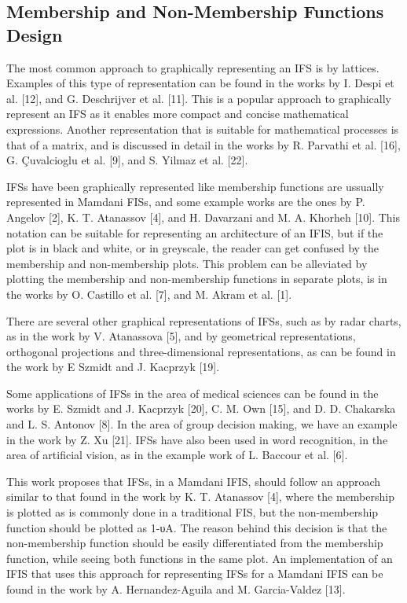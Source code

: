 \subsection{Membership and Non-Membership Functions Design}
\label{subsection:membership-and-non-membership-functions-design}

The most common approach to graphically representing an IFS is by
lattices. Examples of this type of representation can be found in the works by
I. Despi et al. [12], and G. Deschrijver et al. [11]. This is a popular approach
to graphically represent an IFS as it enables more compact and concise
mathematical expressions. Another representation that is suitable for
mathematical processes is that of a matrix, and is discussed in detail in the
works by R. Parvathi et al. [16],  G. Çuvalcioglu et al. [9], and S. Yilmaz et
al. [22].

IFSs have been graphically represented like membership functions are ussually
represented in Mamdani FISs, and some example works are the ones by P. Angelov
[2], K. T. Atanassov [4], and H. Davarzani and M. A. Khorheh [10]. This notation
can be suitable for representing an architecture of an IFIS, but if the plot is
in black and white, or in greyscale, the reader can get confused by the
membership and non-membership plots. This problem can be alleviated by plotting
the membership and non-membership functions in separate plots, is in the works
by O. Castillo et al. [7], and M. Akram et al. [1].

There are several other graphical representations of IFSs, such as by radar
charts, as in the work by V. Atanassova [5], and by geometrical representations,
orthogonal projections and three-dimensional representations, as can be found in
the work by E Szmidt and J. Kacprzyk [19].

Some applications of IFSs in the area of medical sciences can be found in the
works by E. Szmidt and J. Kacprzyk [20],  C. M. Own [15], and D. D. Chakarska
and L. S. Antonov [8]. In the area of group decision making, we have an example
in the work by Z. Xu [21]. IFSs have also been used in word recognition, in the
area of artificial vision, as in the example work of L. Baccour et al. [6].

This work proposes that IFSs, in a Mamdani IFIS, should follow an approach
similar to that found in the work by K. T. Atanassov [4], where the membership
is plotted as is commonly done in a traditional FIS, but the non-membership
function should be plotted as 1-υA. The reason behind this decision is that the
non-membership function should be easily differentiated from the membership
function, while seeing both functions in the same plot. An implementation of an
IFIS that uses this approach for representing IFSs for a Mamdani IFIS can be
found in the work by A. Hernandez-Aguila and M. Garcia-Valdez [13].

